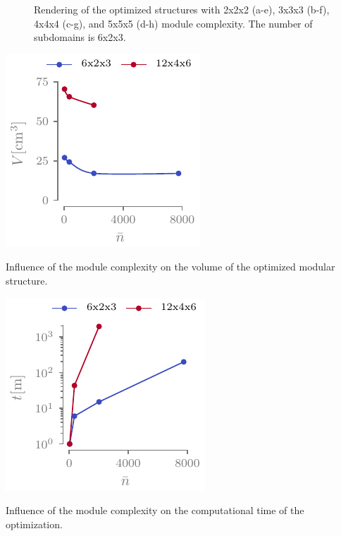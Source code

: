 \begin{figure}
    \hfill
    \hspace*{\fill}
    \caption{Rendering of the optimized structures with 2x2x2 (a-e), 3x3x3 (b-f), 4x4x4 (c-g), and 5x5x5 (d-h) module complexity. The number of subdomains is 6x2x3.}
    \label{fig:05_comp_results}
\end{figure}

\begin{marginfigure}
    \centering
    \includegraphics{figures/05_cellular_opt/00_module_complexity_tab/comp_tab_v.pdf}
    \caption{Influence of the module complexity on the volume of the optimized modular structure.}
    \label{fig:05_comp_v}
\end{marginfigure}

\begin{marginfigure}
    \centering
    \includegraphics{figures/05_cellular_opt/00_module_complexity_tab/comp_tab_t.pdf}
    \caption{Influence of the module complexity on the computational time of the optimization.}
    \label{fig:05_comp_t}
\end{marginfigure}

